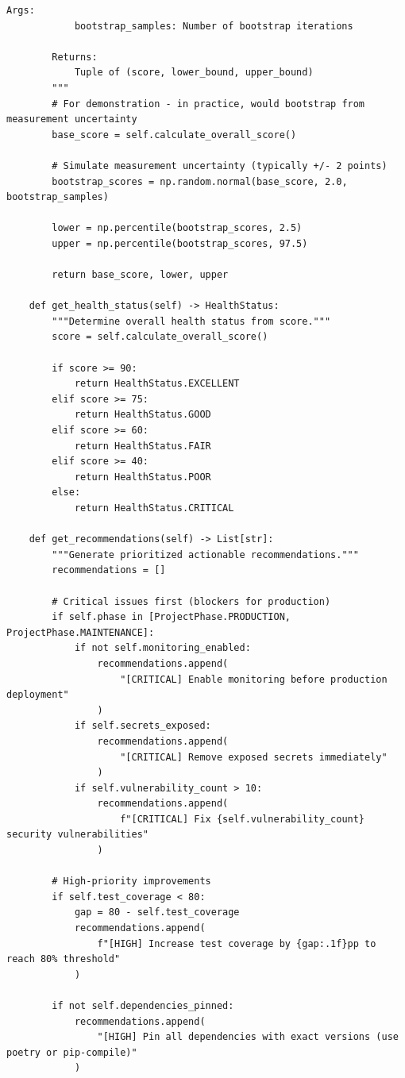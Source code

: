 \begin{lstlisting}[style=python, caption={Comprehensive project health metrics framework with 15+ dimensions}]
        Args:
            bootstrap_samples: Number of bootstrap iterations

        Returns:
            Tuple of (score, lower_bound, upper_bound)
        """
        # For demonstration - in practice, would bootstrap from measurement uncertainty
        base_score = self.calculate_overall_score()

        # Simulate measurement uncertainty (typically +/- 2 points)
        bootstrap_scores = np.random.normal(base_score, 2.0, bootstrap_samples)

        lower = np.percentile(bootstrap_scores, 2.5)
        upper = np.percentile(bootstrap_scores, 97.5)

        return base_score, lower, upper

    def get_health_status(self) -> HealthStatus:
        """Determine overall health status from score."""
        score = self.calculate_overall_score()

        if score >= 90:
            return HealthStatus.EXCELLENT
        elif score >= 75:
            return HealthStatus.GOOD
        elif score >= 60:
            return HealthStatus.FAIR
        elif score >= 40:
            return HealthStatus.POOR
        else:
            return HealthStatus.CRITICAL

    def get_recommendations(self) -> List[str]:
        """Generate prioritized actionable recommendations."""
        recommendations = []

        # Critical issues first (blockers for production)
        if self.phase in [ProjectPhase.PRODUCTION, ProjectPhase.MAINTENANCE]:
            if not self.monitoring_enabled:
                recommendations.append(
                    "[CRITICAL] Enable monitoring before production deployment"
                )
            if self.secrets_exposed:
                recommendations.append(
                    "[CRITICAL] Remove exposed secrets immediately"
                )
            if self.vulnerability_count > 10:
                recommendations.append(
                    f"[CRITICAL] Fix {self.vulnerability_count} security vulnerabilities"
                )

        # High-priority improvements
        if self.test_coverage < 80:
            gap = 80 - self.test_coverage
            recommendations.append(
                f"[HIGH] Increase test coverage by {gap:.1f}pp to reach 80% threshold"
            )

        if not self.dependencies_pinned:
            recommendations.append(
                "[HIGH] Pin all dependencies with exact versions (use poetry or pip-compile)"
            )


\end{lstlisting}
